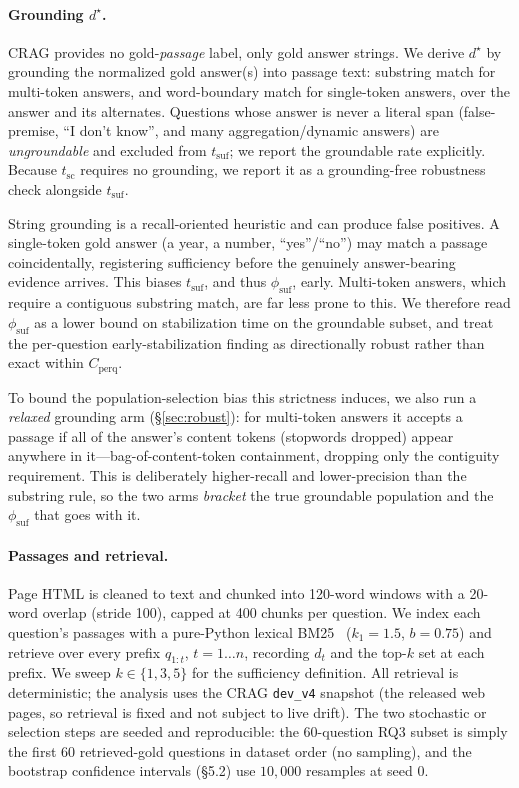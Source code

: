 \documentclass[11pt]{article}
\renewcommand{\cite}{\citep}                         %
\newcommand{\rqThreeN}{60}
\begin{document}
\paragraph{Grounding $d^\star$.} CRAG provides no gold-\emph{passage} label, only
gold answer strings. We derive $d^\star$ by grounding the normalized gold
answer(s) into passage text: substring match for multi-token answers, and
word-boundary match for single-token answers, over the answer and its alternates.
Questions whose answer is never a literal span (false-premise, ``I don't know'',
and many aggregation/dynamic answers) are \emph{ungroundable} and excluded from
$t_{\mathrm{suf}}$; we report the groundable rate explicitly. Because
$t_{\mathrm{sc}}$ requires no grounding, we report it as a grounding-free
robustness check alongside $t_{\mathrm{suf}}$.

String grounding is a recall-oriented heuristic and can produce false positives.
A single-token gold answer (a year, a number, ``yes''/``no'') may match a passage
coincidentally, registering sufficiency before the genuinely answer-bearing
evidence arrives. This biases $t_{\mathrm{suf}}$, and thus $\phi_{\mathrm{suf}}$,
early. Multi-token answers, which require a contiguous
substring match, are far less prone to this. We therefore read $\phi_{\mathrm{suf}}$
as a lower bound on stabilization time on the groundable subset, and treat the
per-question early-stabilization finding as directionally robust rather than exact within $C_{\mathrm{perq}}$.

To bound the population-selection bias this strictness induces, we also run a
\emph{relaxed} grounding arm (\S\ref{sec:robust}): for multi-token answers it accepts
a passage if all of the answer's content tokens (stopwords dropped) appear anywhere in
it---bag-of-content-token containment, dropping only the contiguity requirement. This
is deliberately higher-recall and lower-precision than the substring rule, so the two
arms \emph{bracket} the true groundable population and the $\phi_{\mathrm{suf}}$ that
goes with it.

\paragraph{Passages and retrieval.} Page HTML is cleaned to text and chunked into
120-word windows with a 20-word overlap (stride 100), capped at 400 chunks per
question. We index each question's passages with a pure-Python lexical
BM25~\cite{robertson2009bm25} ($k_1{=}1.5$, $b{=}0.75$) and retrieve over every
prefix $q_{1:t}$, $t=1\dots n$, recording $d_t$ and the top-$k$ set at each prefix.
We sweep $k\in\{1,3,5\}$ for the sufficiency definition. All retrieval is
deterministic; the analysis uses the CRAG \texttt{dev\_v4} snapshot (the released
web pages, so retrieval is fixed and not subject to live drift). The two stochastic
or selection steps are seeded and reproducible: the $\rqThreeN{}$-question RQ3
subset is simply the first \rqThreeN{} retrieved-gold questions in dataset order
(no sampling), and the bootstrap confidence intervals (\S5.2) use $10{,}000$
resamples at seed $0$.
\end{document}
